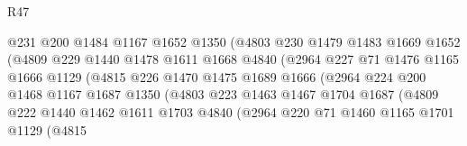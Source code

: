 \begin{lexlean}{R47}
\begin{coremodule}
                              @231
                              @200
                              @1484
                              @1167
                              @1652
                              @1350
                              (@4803
                                @230
                                @1479
                                @1483
                                @1669
                                @1652
                                (@4809
                                  @229
                                  @1440
                                  @1478
                                  @1611
                                  @1668
                                  @4840
                                  (@2964
                                    @227
                                    @71
                                    @1476
                                    @1165
                                    @1666
                                    @1129
                                    (@4815
                                      @226
                                      @1470
                                      @1475
                                      @1689
                                      @1666
                                      (@2964
                                        @224
                                        @200
                                        @1468
                                        @1167
                                        @1687
                                        @1350
                                        (@4803
                                          @223
                                          @1463
                                          @1467
                                          @1704
                                          @1687
                                          (@4809
                                            @222
                                            @1440
                                            @1462
                                            @1611
                                            @1703
                                            @4840
                                            (@2964
                                              @220
                                              @71
                                              @1460
                                              @1165
                                              @1701
                                              @1129
                                              (@4815

\end{coremodule}
\end{lexlean}
